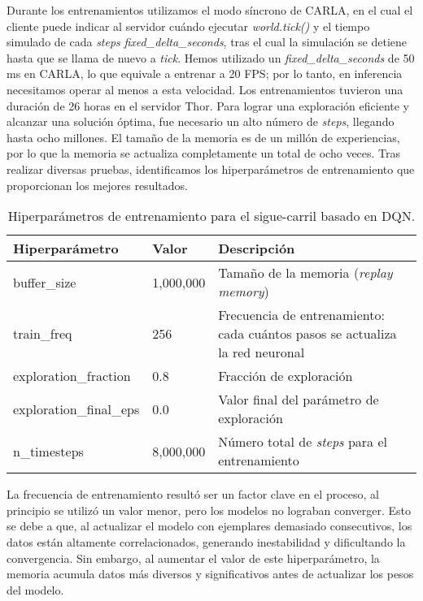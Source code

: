 Durante los entrenamientos utilizamos el modo síncrono de CARLA, en el cual el cliente puede indicar al servidor cuándo ejecutar \textit{world.tick()} y el tiempo simulado de cada \textit{steps} \textit{fixed\_delta\_seconds}, tras el cual la simulación se detiene hasta que se llama de nuevo a \textit{tick}. Hemos utilizado un \textit{fixed\_delta\_seconds} de 50 ms en CARLA, lo que equivale a entrenar a 20 \ac{FPS}; por lo tanto, en inferencia necesitamos operar al menos a esta velocidad. Los entrenamientos tuvieron una duración de 26 horas en el servidor Thor. Para lograr una exploración eficiente y alcanzar una solución óptima, fue necesario un alto número de \textit{steps}, llegando hasta ocho millones. El tamaño de la memoria es de un millón de experiencias, por lo que la memoria se actualiza completamente un total de ocho veces. Tras realizar diversas pruebas, identificamos los hiperparámetros de entrenamiento que proporcionan los mejores resultados.
\begin{table}[ht]
\centering
\renewcommand{\arraystretch}{1.2} %
\begin{tabular}{|l|l|p{9cm}|} %
\hline
\textbf{Hiperparámetro} & \textbf{Valor} & \textbf{Descripción} \\ \hline
buffer\_size & 1,000,000 & Tamaño de la memoria (\textit{replay memory}) \\ \hline
train\_freq & 256 & Frecuencia de entrenamiento: cada cuántos pasos se actualiza la red neuronal \\ \hline
exploration\_fraction & 0.8 & Fracción de exploración \\ \hline
exploration\_final\_eps & 0.0 & Valor final del parámetro de exploración \\ \hline
n\_timesteps & 8,000,000 & Número total de \textit{steps} para el entrenamiento \\ \hline
\end{tabular}
\caption{Hiperparámetros de entrenamiento para el sigue-carril basado en \ac{DQN}.}
\label{tab:hiperparametros}
\end{table}

La frecuencia de entrenamiento resultó ser un factor clave en el proceso, al principio se utilizó un valor menor, pero los modelos no lograban converger. Esto se debe a que, al actualizar el modelo con ejemplares demasiado consecutivos, los datos están altamente correlacionados, generando inestabilidad y dificultando la convergencia. Sin embargo, al aumentar el valor de este hiperparámetro, la memoria acumula datos más diversos y significativos antes de actualizar los pesos del modelo.

